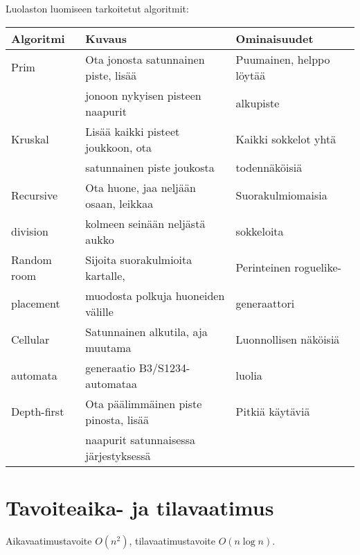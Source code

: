 \documentclass{article}
\begin{document}
\noindent
Luolaston luomiseen tarkoitetut algoritmit:
\begin{table}[h]
\begin{tabular}{| l | p{6.5cm} | l |}
\hline
\rowcolor{Gray}
Algoritmi   & Kuvaus                                & Ominaisuudet              \\ \hline
Prim        & Ota jonosta satunnainen piste, lisää  & Puumainen, helppo löytää  \\
            & jonoon nykyisen pisteen naapurit      & alkupiste                 \\ \hline
Kruskal     & Lisää kaikki pisteet joukkoon, ota    & Kaikki sokkelot yhtä      \\
            & satunnainen piste joukosta            & todennäköisiä             \\ \hline
Recursive   & Ota huone, jaa neljään osaan, leikkaa & Suorakulmiomaisia         \\ 
division    & kolmeen seinään neljästä aukko        & sokkeloita                \\ \hline
Random room & Sijoita suorakulmioita kartalle,      & Perinteinen roguelike-    \\ 
placement   & muodosta polkuja huoneiden välille    & generaattori              \\ \hline
Cellular    & Satunnainen alkutila, aja muutama     & Luonnollisen näköisiä     \\ 
automata    & generaatio B3/S1234-automataa         & luolia                    \\ \hline
Depth-first & Ota päälimmäinen piste pinosta, lisää & Pitkiä käytäviä           \\ 
            & naapurit satunnaisessa järjestyksessä &                           \\ \hline
\end{tabular}
\end{table}

\section{Tavoiteaika- ja tilavaatimus}
Aikavaatimustavoite $O(n^2)$, tilavaatimustavoite $O(n \log n)$.
\end{document}
